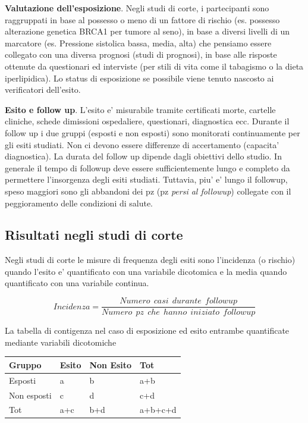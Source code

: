 \documentclass[]{book}
\begin{document}
\textbf{Valutazione dell'esposizione}. Negli studi di corte, i partecipanti sono raggruppati in base al possesso o meno di un fattore di rischio (es. possesso alterazione genetica BRCA1 per tumore al seno), in base a diversi livelli di un marcatore (es. Pressione sistolica bassa, media, alta) che pensiamo essere collegato con una diversa prognosi (studi di prognosi), in base alle risposte ottenute da questionari ed interviste (per stili di vita come il tabagismo o la dieta iperlipidica). Lo status di esposizione se possibile viene tenuto nascosto ai verificatori dell'esito.

\textbf{Esito e follow up}. L'esito e' misurabile tramite certificati morte, cartelle cliniche, schede dimissioni ospedaliere, questionari, diagnostica ecc. Durante il follow up i due gruppi (esposti e non esposti) sono monitorati continuamente per gli esiti studiati. Non ci devono essere differenze di accertamento (capacita' diagnostica). La durata del follow up dipende dagli obiettivi dello studio. In generale il tempo di followup deve essere sufficientemente lungo e completo da permettere l'insorgenza degli esiti studiati. Tuttavia, piu' e' lungo il followup, speso maggiori sono gli abbandoni dei pz (pz \emph{persi al followup}) collegate con il peggioramento delle condizioni di salute.

\hypertarget{risultati-negli-studi-di-corte}{%
\subsection{Risultati negli studi di corte}\label{risultati-negli-studi-di-corte}}

Negli studi di corte le misure di frequenza degli esiti sono l'incidenza (o rischio) quando l'esito e' quantificato con una variabile dicotomica e la media quando quantificato con una variabile continua.

\[Incidenza = \frac{Numero\ \ casi\ \ durante\ \ followup}{Numero\ \ pz\ \ che\ \ hanno\ \ iniziato \ \  followup}\]

La tabella di contigenza nel caso di esposizione ed esito entrambe quantificate mediante variabili dicotomiche

\begin{longtable}[]{@{}llll@{}}
\toprule
Gruppo & Esito & Non Esito & Tot\tabularnewline
\midrule
\endhead
Esposti & a & b & a+b\tabularnewline
Non esposti & c & d & c+d\tabularnewline
Tot & a+c & b+d & a+b+c+d\tabularnewline
\bottomrule
\end{longtable}
\end{document}

